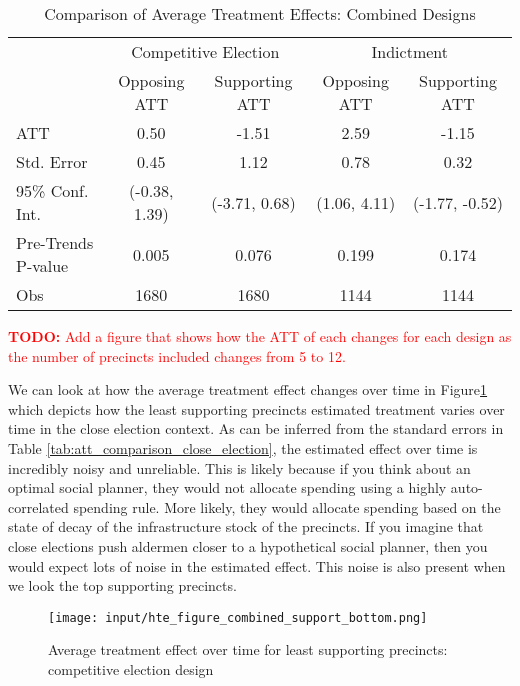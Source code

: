 \begin{table}[ht]
    \centering
    \caption{Comparison of Average Treatment Effects: Combined Designs}
    \label{tab:att_comparison_combined}
    \begin{tabular}{lcc|cc}
    \hline
     & \multicolumn{2}{c|}{Competitive Election} & \multicolumn{2}{c}{Indictment} \\
     & Opposing ATT & Supporting ATT & Opposing ATT & Supporting ATT \\
    \hline
    ATT & 0.50 & -1.51 & 2.59 & -1.15 \\
    Std. Error & 0.45 & 1.12 & 0.78 & 0.32 \\
    95\% Conf. Int. & (-0.38, 1.39) & (-3.71, 0.68) & (1.06, 4.11) & (-1.77, -0.52) \\
    Pre-Trends P-value & 0.005  & 0.076 & 0.199 & 0.174 \\
    Obs & 1680 & 1680 & 1144 & 1144 \\
    \hline
    \end{tabular}
\end{table}

\textcolor{red}{\textbf{TODO:} Add a figure that shows how the ATT of each changes for each design as the number of precincts included changes from 5 to 12.}

We can look at how the average treatment effect changes over time in Figure\ref{fig:att_comparison_close_election_bottom} which depicts how the least supporting precincts estimated treatment varies over time in the close election context.
As can be inferred from the standard errors in Table \ref{tab:att_comparison_close_election}, the estimated effect over time is incredibly noisy and unreliable.
This is likely because if you think about an optimal social planner, they would not allocate spending using a highly auto-correlated spending rule.
More likely, they would allocate spending based on the state of decay of the infrastructure stock of the precincts.
If you imagine that close elections push aldermen closer to a hypothetical social planner, then you would expect lots of noise in the estimated effect.
This noise is also present when we look the top supporting precincts.
\begin{figure}[ht]
    \centering
    \texttt{[image: input/hte\_figure\_combined\_support\_bottom.png]}
    \caption{Average treatment effect over time for least supporting precincts: competitive election design}
    \label{fig:att_comparison_close_election_bottom}
\end{figure}


